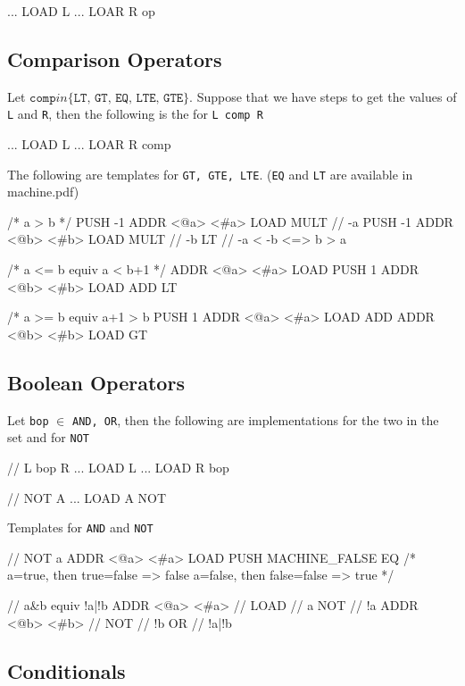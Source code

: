 \begin{code}
...
LOAD L
...
LOAR R
op
\end{code}

\subsection{Comparison Operators}

Let $\texttt{comp} in \{\texttt{LT, GT, EQ, LTE, GTE}\}$. Suppose that we have
steps to get the values of \texttt{L} and \texttt{R}, then the following is the
for \texttt{L comp R}

\begin{code}
...
LOAD L
...
LOAR R
comp
\end{code}


The following are templates for \texttt{GT, GTE, LTE}. (\texttt{EQ} and
\texttt{LT} are available in machine.pdf)


\begin{code}[GT]
/* a > b */
PUSH -1
ADDR <@a> <#a>
LOAD
MULT            // -a
PUSH -1
ADDR <@b> <#b>
LOAD
MULT            // -b
LT              // -a < -b <=> b > a
\end{code}

\begin{code}[LTE]
/* a <= b equiv a < b+1 */
ADDR <@a> <#a>
LOAD
PUSH 1
ADDR <@b> <#b>
LOAD
ADD
LT
\end{code}

\begin{code}[GTE]
/* a >= b equiv a+1 > b
PUSH 1
ADDR <@a> <#a>
LOAD
ADD
ADDR <@b> <#b>
LOAD
GT
\end{code}

\subsection{Boolean Operators}
Let \texttt{bop} $\in$ \texttt{AND, OR}, then the following are implementations
for the two in the set and for \texttt{NOT}

\begin{code}
// L bop R 
...
LOAD L
...
LOAD R
bop

// NOT A
...
LOAD A
NOT
\end{code}

Templates for \texttt{AND} and \texttt{NOT}

\begin{code}[NOT]
// NOT a
ADDR <@a> <#a>
LOAD
PUSH MACHINE_FALSE
EQ 
/* 
  a=true, then true=false => false
  a=false, then false=false => true
*/
\end{code}

\begin{code}[AND]
// a&b equiv !a|!b
ADDR <@a> <#a> // 
LOAD           // a 
NOT            // !a
ADDR <@b> <#b> //
NOT            // !b
OR             // !a|!b
\end{code}
\subsection{Conditionals}
